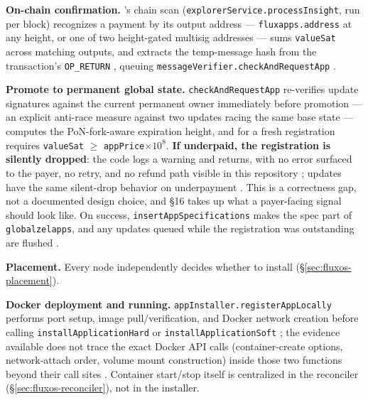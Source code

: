 \textbf{On-chain confirmation.} \fluxd's chain scan (\texttt{explorerService.\allowbreak{}processInsight}, run
per block) recognizes a payment by its output address — \texttt{fluxapps.\allowbreak{}address} at any height, or
one of two height-gated multisig addresses — sums \texttt{valueSat} across matching outputs, and
extracts the temp-message hash from the transaction's \texttt{OP\_RETURN}
, queuing
\texttt{messageVerifier.\allowbreak{}checkAndRequestApp} .

\textbf{Promote to permanent global state.} \texttt{check\allowbreak{}And\allowbreak{}Request\allowbreak{}App} re-verifies update
signatures against the current permanent owner immediately before promotion — an explicit
anti-race measure against two updates racing the same base state
 — computes the
PoN-fork-aware expiration height, and for a fresh registration requires
\texttt{valueSat} $\geq$ \texttt{appPrice}$\times 10^{8}$. \textbf{If underpaid, the registration is
silently dropped}: the code logs a warning and returns, with no error surfaced to the payer, no
retry, and no refund path visible in this repository
; updates have the
same silent-drop behavior on underpayment
. This is a
correctness gap, not a documented design choice, and \S16 takes up what a payer-facing signal
should look like. On success, \texttt{insert\allowbreak{}App\allowbreak{}Specifications} makes the spec part of
\texttt{globalzelapps}, and any updates queued while the registration was outstanding are flushed
.

\textbf{Placement.} Every node independently decides whether to install (\S\ref{sec:fluxos-placement}).

\textbf{Docker deployment and running.} \texttt{appInstaller.\allowbreak{}registerAppLocally} performs port
setup, image pull/verification, and Docker network creation before calling
\texttt{install\allowbreak{}Application\allowbreak{}Hard} or \texttt{install\allowbreak{}Application\allowbreak{}Soft}
; the evidence available
does not trace the exact Docker API calls (container-create options, network-attach order, volume
mount construction) inside those two functions beyond their call sites
\srcinferred. Container start/stop itself is centralized in the reconciler
(\S\ref{sec:fluxos-reconciler}), not in the installer.

